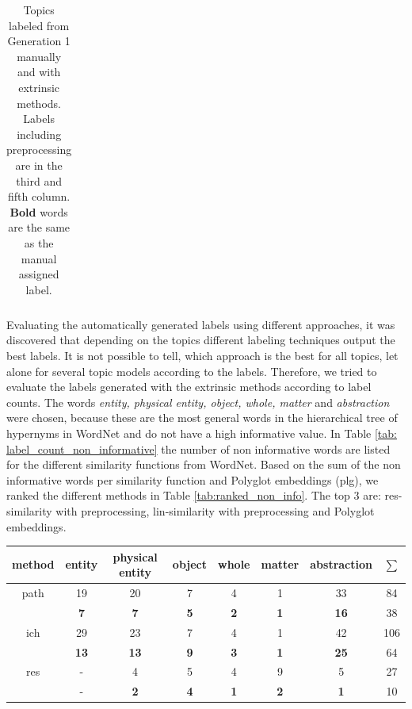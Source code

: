 {\begin{table}
\begin{minipage}[t]{0.5\textwidth}
\begin{tabular}{c|ll}
		\end{tabular}
	\end{minipage}
	\caption[Labeled topics with extrinsic methods and manually]{Topics labeled from Generation 1 manually and with extrinsic methods. Labels including preprocessing are in the third and fifth column. \textbf{Bold} words are the same as the manual assigned label.}
	\label{tab: labeled_extrinsic_and_manually}
\end{table}
Evaluating the automatically generated labels using different approaches, it was discovered that depending on the topics different labeling techniques output the best labels. It is not possible to tell, which approach is the best for all topics, let alone for several topic models according to the labels. Therefore, we tried to evaluate the labels generated with the extrinsic methods according to label counts. The words \textit{entity, physical entity, object, whole, matter} and \textit{abstraction} were chosen, because these are the most general words in the hierarchical tree of hypernyms in WordNet and do not have a high informative value. 
In Table \ref{tab: label_count_non_informative} the number of non informative words are listed for the different similarity functions from WordNet. Based on the sum of the non informative words per similarity function and Polyglot embeddings (plg), we ranked the different methods in Table \ref{tab:ranked_non_info}. The top 3 are: res-similarity with preprocessing, lin-similarity with preprocessing and Polyglot embeddings.
\begin{table}[h]
	\begin{tabular}{c|c|c|c|c|c|c|c}
		method & entity	& physical entity & object & whole & matter & abstraction & $\sum$ \\
		\hline
		path& 19		&20				  &7	   &4      &1       &33 &84\\
		& \textbf{7}&\textbf{7}	 &\textbf{5}  &\textbf{2} &\textbf{1} &\textbf{16} & 38\\
		\hline
		ich& 29		&23				  &7	   &4      &1       &42 & 106\\
		& \textbf{13}&\textbf{13}	 &\textbf{9}  &\textbf{3} &\textbf{1} &\textbf{25} & 64\\
		\hline
		res& -		&4				  &5	   &4      &9       &5 &27\\
		& -			&\textbf{2}	 &\textbf{4}  &\textbf{1} &\textbf{2} &\textbf{1} &10\\

\end{tabular}
\end{table}}
